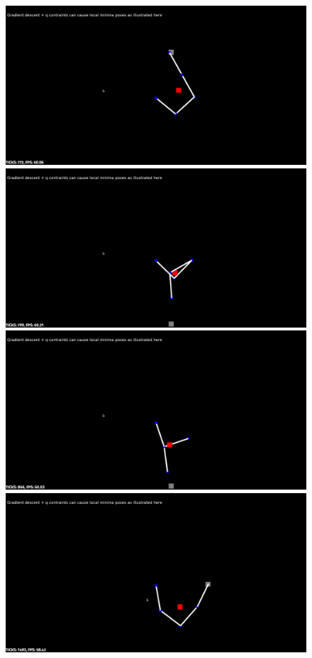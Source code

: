 \documentclass[12pt]{article}
\begin{document}
\begin{figure}[!htb]
\includegraphics[width=\linewidth]{figures/1.a.jpg}
\endminipage\hfill
{}
\includegraphics[width=\linewidth]{figures/1.b.jpg}
\endminipage\hfill
{}%
\includegraphics[width=\linewidth]{figures/1.c.jpg}
\endminipage
\\
\includegraphics[width=\linewidth]{figures/2.a.jpg}

\end{figure}
\end{document}
